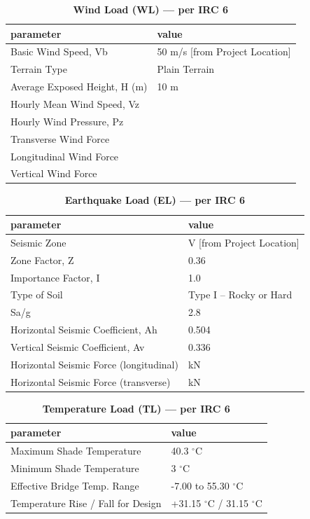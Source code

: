 \documentclass[12pt,a4paper]{report}
\numberwithin{table}{chapter}
\numberwithin{figure}{chapter}
\begin{document}
\vspace{1em}
\begin{longtable}{|L{5.5cm}|p{10.0cm}|}
\caption{\textbf{Wind Load (WL) --- per IRC 6}}
\hline
\textbf{parameter} & \textbf{value} \\
\hline
\textnormal{Basic Wind Speed, Vb} & 50 m/s [from Project Location] \\[6pt]
\hline
\textnormal{Terrain Type} & Plain Terrain \\[6pt]
\hline
\textnormal{Average Exposed Height, H (m)} & 10 m \\[6pt]
\hline
\textnormal{Hourly Mean Wind Speed, Vz} &  \\[6pt]
\hline
\textnormal{Hourly Wind Pressure, Pz} &  \\[6pt]
\hline
\textnormal{Transverse Wind Force} &  \\[6pt]
\hline
\textnormal{Longitudinal Wind Force} &  \\[6pt]
\hline
\textnormal{Vertical Wind Force} &  \\[6pt]
\hline
\end{longtable}

\vspace{1em}
\begin{longtable}{|L{5.5cm}|p{10.0cm}|}
\caption{\textbf{Earthquake Load (EL) --- per IRC 6}}
\hline
\textbf{parameter} & \textbf{value} \\
\hline
\textnormal{Seismic Zone} & V [from Project Location] \\[6pt]
\hline
\textnormal{Zone Factor, Z} & 0.36 \\[6pt]
\hline
\textnormal{Importance Factor, I} & 1.0 \\[6pt]
\hline
\textnormal{Type of Soil} & Type I – Rocky or Hard \\[6pt]
\hline
\textnormal{Sa/g} & 2.8 \\[6pt]
\hline
\textnormal{Horizontal Seismic Coefficient, Ah} & 0.504 \\[6pt]
\hline
\textnormal{Vertical Seismic Coefficient, Av} & 0.336 \\[6pt]
\hline
\textnormal{Horizontal Seismic Force (longitudinal)} &  kN \\[6pt]
\hline
\textnormal{Horizontal Seismic Force (transverse)} &  kN \\[6pt]
\hline
\end{longtable}

\vspace{1em}
\begin{longtable}{|L{5.5cm}|p{10.0cm}|}
\caption{\textbf{Temperature Load (TL) --- per IRC 6}}
\hline
\textbf{parameter} & \textbf{value} \\
\hline
\textnormal{Maximum Shade Temperature} & 40.3 $^\circ$C \\[6pt]
\hline
\textnormal{Minimum Shade Temperature} & 3 $^\circ$C \\[6pt]
\hline
\textnormal{Effective Bridge Temp. Range} & -7.00 to 55.30 $^\circ$C \\[6pt]
\hline
\textnormal{Temperature Rise / Fall for Design} & +31.15 $^\circ$C / \textminus{}31.15 $^\circ$C \\[6pt]
\hline
\end{longtable}
\end{document}
